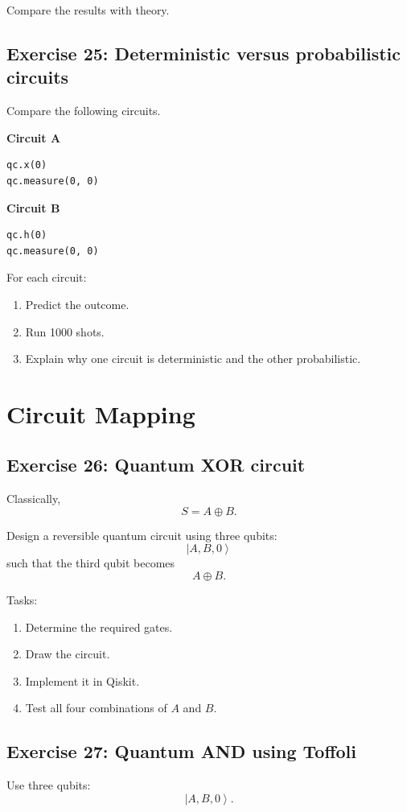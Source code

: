 \documentclass[12pt,a4paper]{article}
\newcommand{\ket}[1]{\left|#1\right\rangle}
\begin{document}
Compare the results with theory.

\subsection*{Exercise 25: Deterministic versus probabilistic circuits}
Compare the following circuits.

\textbf{Circuit A}
\begin{lstlisting}
qc.x(0)
qc.measure(0, 0)
\end{lstlisting}

\textbf{Circuit B}
\begin{lstlisting}
qc.h(0)
qc.measure(0, 0)
\end{lstlisting}

For each circuit:
\begin{enumerate}
    \item Predict the outcome.
    \item Run 1000 shots.
    \item Explain why one circuit is deterministic and the other probabilistic.
\end{enumerate}

\section{Circuit Mapping}

\subsection*{Exercise 26: Quantum XOR circuit}
Classically,
\[
S=A\oplus B.
\]

Design a reversible quantum circuit using three qubits:
\[
\ket{A,B,0}
\]
such that the third qubit becomes
\[
A\oplus B.
\]

Tasks:
\begin{enumerate}
    \item Determine the required gates.
    \item Draw the circuit.
    \item Implement it in Qiskit.
    \item Test all four combinations of $A$ and $B$.
\end{enumerate}

\subsection*{Exercise 27: Quantum AND using Toffoli}
Use three qubits:
\[
\ket{A,B,0}.
\]
\end{document}
